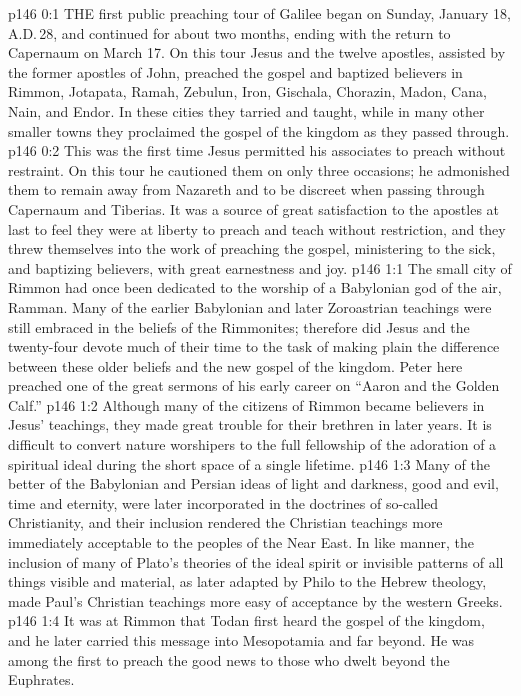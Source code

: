 \vs p146 0:1 THE first public preaching tour of Galilee began on Sunday, January 18, A.D.\,28, and continued for about two months, ending with the return to Capernaum on March 17. On this tour Jesus and the twelve apostles, assisted by the former apostles of John, preached the gospel and baptized believers in Rimmon, Jotapata, Ramah, Zebulun, Iron, Gischala, Chorazin, Madon, Cana, Nain, and Endor. In these cities they tarried and taught, while in many other smaller towns they proclaimed the gospel of the kingdom as they passed through.
\vs p146 0:2 This was the first time Jesus permitted his associates to preach without restraint. On this tour he cautioned them on only three occasions; he admonished them to remain away from Nazareth and to be discreet when passing through Capernaum and Tiberias. It was a source of great satisfaction to the apostles at last to feel they were at liberty to preach and teach without restriction, and they threw themselves into the work of preaching the gospel, ministering to the sick, and baptizing believers, with great earnestness and joy.
\vs p146 1:1 The small city of Rimmon had once been dedicated to the worship of a Babylonian god of the air, Ramman. Many of the earlier Babylonian and later Zoroastrian teachings were still embraced in the beliefs of the Rimmonites; therefore did Jesus and the twenty\hyp{}four devote much of their time to the task of making plain the difference between these older beliefs and the new gospel of the kingdom. Peter here preached one of the great sermons of his early career on “Aaron and the Golden Calf.”
\vs p146 1:2 Although many of the citizens of Rimmon became believers in Jesus’ teachings, they made great trouble for their brethren in later years. It is difficult to convert nature worshipers to the full fellowship of the adoration of a spiritual ideal during the short space of a single lifetime.
\vs p146 1:3 \pc Many of the better of the Babylonian and Persian ideas of light and darkness, good and evil, time and eternity, were later incorporated in the doctrines of so\hyp{}called Christianity, and their inclusion rendered the Christian teachings more immediately acceptable to the peoples of the Near East. In like manner, the inclusion of many of Plato’s theories of the ideal spirit or invisible patterns of all things visible and material, as later adapted by Philo to the Hebrew theology, made Paul’s Christian teachings more easy of acceptance by the western Greeks.
\vs p146 1:4 \pc It was at Rimmon that Todan first heard the gospel of the kingdom, and he later carried this message into Mesopotamia and far beyond. He was among the first to preach the good news to those who dwelt beyond the Euphrates.
